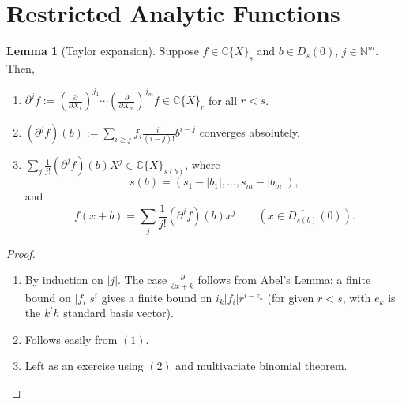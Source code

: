 \documentclass[12pt]{article}
\theoremstyle{theorem}            %
\theoremstyle{definition}           %
\newtheorem{lemma}[theorem]{Lemma}
\theoremstyle{empty}
\begin{document}
\section{Restricted Analytic Functions}

\begin{lemma}[Taylor expansion] Suppose $f\in \mathds{C}\{X\}_s$ and $b\in D_s(0)$, $j\in \mathds{N}^m$.  Then,
\begin{enumerate}[(1)]
\item $\partial^j f :=\left (\frac{\partial}{\partial X_1} \right )^{j_1} \cdots \left (\frac{\partial}{\partial X_m} \right )^{j_m}f\in \mathds{C}\{X\}_r$ for all $r<s$.
\item $(\partial^jf)(b):= \sum_{i\geq j} f_i \frac{i!}{(i-j)!}b^{i-j}$ converges absolutely.  
\item $\sum_j \frac{1}{j!} (\partial^jf)(b)X^j\in \mathds{C}\{X\}_{s(b)}$, where
$$s(b)=(s_1-|b_1|, \dots, s_m-|b_m|),$$
and
$$f(x+b) = \sum_j\frac{1}{j!}(\partial^jf)(b)x^j \qquad (x\in \overline{D_{s(b)}}(0)).$$
\end{enumerate}
\end{lemma}

\begin{proof} \begin{enumerate}[(1)]
\item By induction on $|j|$.  The case $\frac{\partial}{\partial x+k}$ follows from Abel's Lemma: a finite bound on $|f_i|s^i$ gives a finite bound on $i_k|f_i|r^{i-e_k}$ (for given $r<s$, with $e_k$ is the $k^th$ standard basis vector).  
\item Follows easily from $(1)$.
\item Left as an exercise using $(2)$ and multivariate binomial theorem. 
\end{enumerate}\end{proof}
\end{document}
